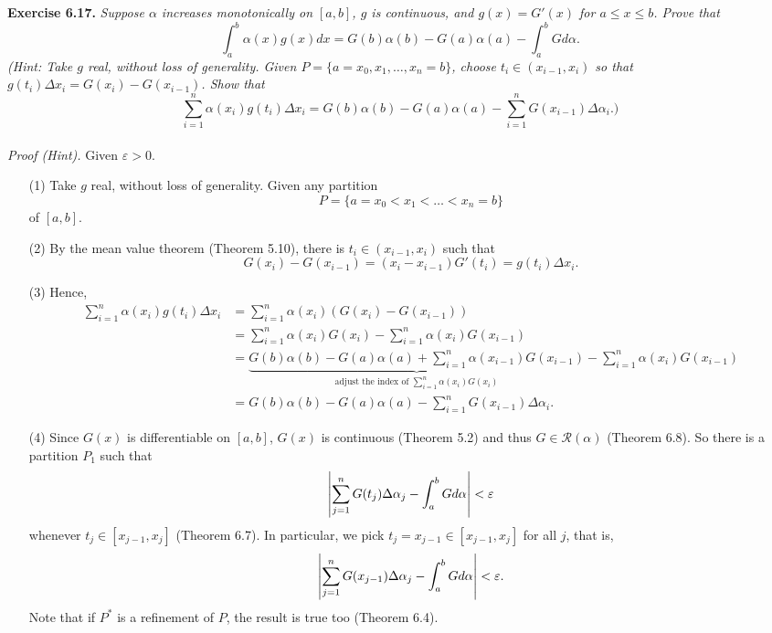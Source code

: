 \documentclass{article}
\begin{document}



\textbf{Exercise 6.17.}
\emph{Suppose $\alpha$ increases monotonically on $[a,b]$,
$g$ is continuous,
and $g(x) = G'(x)$ for $a \leq x \leq b$.
Prove that
\[
  \int_{a}^{b} \alpha(x)g(x)dx
  = G(b)\alpha(b) - G(a)\alpha(a) - \int_{a}^{b}G d\alpha.
\]
(Hint: Take $g$ real, without loss of generality.
Given $P = \{a = x_0, x_1, \ldots, x_n = b\}$,
choose $t_i \in (x_{i-1},x_i)$ so that $g(t_i)\Delta x_i = G(x_i) - G(x_{i-1})$.
Show that
\[
  \sum_{i=1}^{n} \alpha(x_i)g(t_i)\Delta x_i
  = G(b)\alpha(b) - G(a)\alpha(a) - \sum_{i=1}^{n} G(x_{i-1})\Delta \alpha_i.)
\]} \\

\emph{Proof (Hint).}
Given $\varepsilon > 0$.
\begin{enumerate}
  \item[(1)]
  Take $g$ real, without loss of generality.
  Given any partition
  \[
    P = \{a = x_0 < x_1 < \ldots < x_n = b\}
  \]
  of $[a,b]$.

  \item[(2)]
  By the mean value theorem (Theorem 5.10), there is $t_i \in (x_{i-1},x_i)$
  such that
  \[
    G(x_i) - G(x_{i-1}) = (x_i - x_{i-1})G'(t_i) = g(t_i)\Delta x_i.
  \]

  \item[(3)]
  Hence,
  \begin{align*}
    \sum_{i=1}^{n} \alpha(x_i)g(t_i)\Delta x_i
    &= \sum_{i=1}^{n} \alpha(x_i)(G(x_i) - G(x_{i-1})) \\
    &= \sum_{i=1}^{n} \alpha(x_i)G(x_i) - \sum_{i=1}^{n} \alpha(x_i)G(x_{i-1}) \\
    &= \underbrace{G(b)\alpha(b) - G(a)\alpha(a)
      + \sum_{i=1}^{n} \alpha(x_{i-1})G(x_{i-1})}_{\text{
        adjust the index of $\sum_{i=1}^{n} \alpha(x_i)G(x_i)$}}
      - \sum_{i=1}^{n} \alpha(x_i)G(x_{i-1}) \\
    &= G(b)\alpha(b) - G(a)\alpha(a) - \sum_{i=1}^{n} G(x_{i-1}) \Delta\alpha_i.
  \end{align*}

  \item[(4)]
  Since $G(x)$ is differentiable on $[a,b]$,
  $G(x)$ is continuous (Theorem 5.2) and thus $G \in \mathscr{R}(\alpha)$ (Theorem 6.8).
  So there is a partition $P_1$ such that
  \[
    \abs{\sum_{j=1}^{n} G(t_j)\Delta\alpha_j - \int_{a}^{b}G d\alpha }
    < \varepsilon
  \]
  whenever $t_j \in [x_{j-1},x_j]$ (Theorem 6.7).
  In particular, we pick $t_j = x_{j-1} \in [x_{j-1},x_j]$ for all $j$, that is,
  \[
    \abs{\sum_{j=1}^{n} G(x_{j-1})\Delta\alpha_j - \int_{a}^{b}G d\alpha }
    < \varepsilon.
  \]
  Note that if $P^{*}$ is a refinement of $P$, the result is true too (Theorem 6.4).


\end{enumerate}
\end{document}
